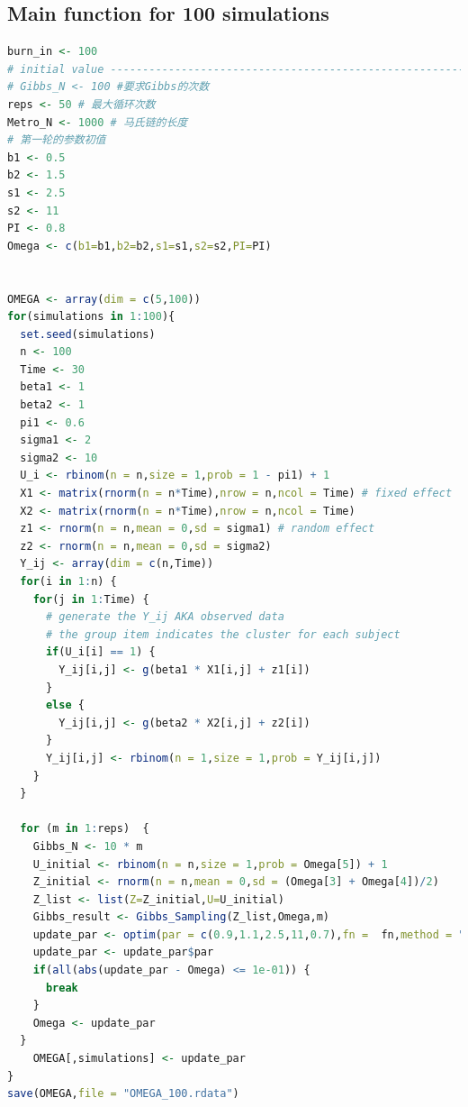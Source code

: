 \documentclass[11pt]{article}
\begin{document}
\subsection{Main function for 100 simulations}
  \begin{lstlisting}[language=R] 
burn_in <- 100
# initial value -----------------------------------------------------------
# Gibbs_N <- 100 #要求Gibbs的次数
reps <- 50 # 最大循环次数
Metro_N <- 1000 # 马氏链的长度
# 第一轮的参数初值
b1 <- 0.5
b2 <- 1.5
s1 <- 2.5
s2 <- 11
PI <- 0.8
Omega <- c(b1=b1,b2=b2,s1=s1,s2=s2,PI=PI)


OMEGA <- array(dim = c(5,100))
for(simulations in 1:100){
  set.seed(simulations)
  n <- 100
  Time <- 30
  beta1 <- 1
  beta2 <- 1
  pi1 <- 0.6
  sigma1 <- 2
  sigma2 <- 10
  U_i <- rbinom(n = n,size = 1,prob = 1 - pi1) + 1
  X1 <- matrix(rnorm(n = n*Time),nrow = n,ncol = Time) # fixed effect
  X2 <- matrix(rnorm(n = n*Time),nrow = n,ncol = Time)
  z1 <- rnorm(n = n,mean = 0,sd = sigma1) # random effect
  z2 <- rnorm(n = n,mean = 0,sd = sigma2)
  Y_ij <- array(dim = c(n,Time))
  for(i in 1:n) {
    for(j in 1:Time) {
      # generate the Y_ij AKA observed data
      # the group item indicates the cluster for each subject
      if(U_i[i] == 1) {
        Y_ij[i,j] <- g(beta1 * X1[i,j] + z1[i])
      }
      else {
        Y_ij[i,j] <- g(beta2 * X2[i,j] + z2[i])
      }
      Y_ij[i,j] <- rbinom(n = 1,size = 1,prob = Y_ij[i,j])
    }
  }
  
  for (m in 1:reps)  {
    Gibbs_N <- 10 * m
    U_initial <- rbinom(n = n,size = 1,prob = Omega[5]) + 1
    Z_initial <- rnorm(n = n,mean = 0,sd = (Omega[3] + Omega[4])/2)
    Z_list <- list(Z=Z_initial,U=U_initial)
    Gibbs_result <- Gibbs_Sampling(Z_list,Omega,m) 
    update_par <- optim(par = c(0.9,1.1,2.5,11,0.7),fn =  fn,method = "BFGS",control = list(trace = 2))
    update_par <- update_par$par
    if(all(abs(update_par - Omega) <= 1e-01)) {
      break
    }
    Omega <- update_par
  }
    OMEGA[,simulations] <- update_par
}
save(OMEGA,file = "OMEGA_100.rdata")
  \end{lstlisting}
\end{document}
